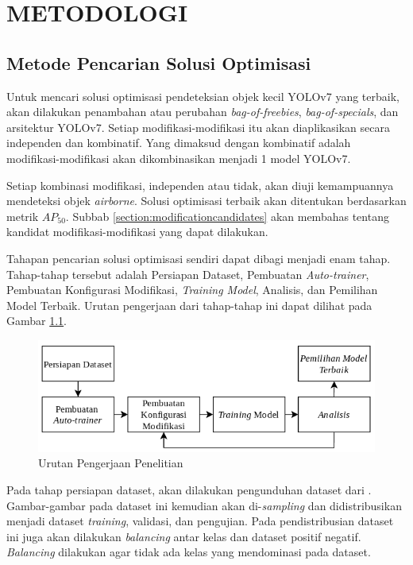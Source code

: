 \chapter{METODOLOGI}
\section{Metode Pencarian Solusi Optimisasi}
  Untuk mencari solusi optimisasi pendeteksian objek kecil YOLOv7 yang terbaik, akan dilakukan penambahan atau perubahan \emph{bag-of-freebies}, \emph{bag-of-specials}, dan arsitektur YOLOv7.
  Setiap modifikasi-modifikasi itu akan diaplikasikan secara independen dan kombinatif.
  Yang dimaksud dengan kombinatif adalah modifikasi-modifikasi akan dikombinasikan menjadi 1 model YOLOv7.

  Setiap kombinasi modifikasi, independen atau tidak, akan diuji kemampuannya mendeteksi objek \emph{airborne}.
  Solusi optimisasi terbaik akan ditentukan berdasarkan metrik $AP_{50}$.
  Subbab \ref{section:modificationcandidates} akan membahas tentang kandidat modifikasi-modifikasi yang dapat dilakukan.

  Tahapan pencarian solusi optimisasi sendiri dapat dibagi menjadi enam tahap.
  Tahap-tahap tersebut adalah Persiapan Dataset, Pembuatan \emph{Auto-trainer}, Pembuatan Konfigurasi Modifikasi, \emph{Training Model}, Analisis, dan Pemilihan Model Terbaik.
  Urutan pengerjaan dari tahap-tahap ini dapat dilihat pada Gambar \ref{fig:metodologi}.
  \begin{figure}[ht]
    \centering
    \includegraphics[scale=0.8]{pictures/metodologi.png}
    \caption{Urutan Pengerjaan Penelitian}
    \label{fig:metodologi}
  \end{figure}

  Pada tahap persiapan dataset, akan dilakukan pengunduhan dataset dari \textcite{aot_dataset}.
  Gambar-gambar pada dataset ini kemudian akan di-\emph{sampling} dan didistribusikan menjadi dataset \emph{training}, validasi, dan pengujian.
  Pada pendistribusian dataset ini juga akan dilakukan \emph{balancing} antar kelas dan dataset positif negatif.
  \emph{Balancing} dilakukan agar tidak ada kelas yang mendominasi pada dataset.

